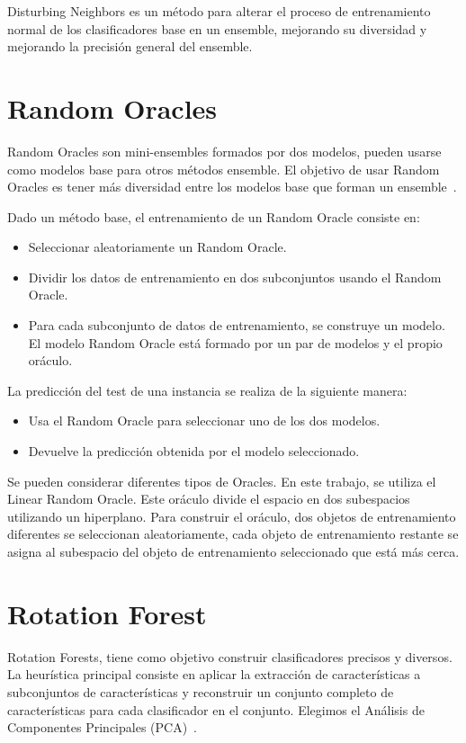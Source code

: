 Disturbing Neighbors es un método para alterar el proceso de entrenamiento normal de los clasificadores base en un ensemble, mejorando su diversidad y mejorando la precisión general del ensemble.

\section{Random Oracles}

Random Oracles son mini-ensembles formados por dos modelos, pueden usarse como modelos base para otros métodos ensemble. El objetivo de usar Random Oracles es tener más diversidad entre los modelos base que forman un ensemble~\cite{randomoracles}.

Dado un método base, el entrenamiento de un Random Oracle consiste en:
\begin{itemize}

	\item Seleccionar aleatoriamente un Random Oracle.
	\item Dividir los datos de entrenamiento en dos subconjuntos usando el Random Oracle.
	\item Para cada subconjunto de datos de entrenamiento, se construye un modelo. El modelo Random Oracle está formado por un par de modelos  y el propio oráculo.
\end{itemize}
La predicción del test de una instancia se realiza de la siguiente manera: 
\begin{itemize}
	\item Usa el Random Oracle para seleccionar uno de los dos modelos.
	\item Devuelve la predicción obtenida por el modelo seleccionado.
\end{itemize}

Se pueden considerar diferentes tipos de Oracles. En este trabajo, se utiliza el Linear Random Oracle. Este oráculo divide el espacio en dos subespacios utilizando un hiperplano. Para construir el oráculo, dos objetos de entrenamiento diferentes se seleccionan aleatoriamente, cada objeto de entrenamiento restante se asigna al subespacio del objeto de entrenamiento seleccionado que está más cerca.

\section{Rotation Forest}

Rotation Forests, tiene como objetivo construir clasificadores precisos y diversos. La heurística principal consiste en aplicar la extracción de características a subconjuntos de características y reconstruir un conjunto completo de características para cada clasificador en el conjunto. Elegimos el Análisis de Componentes Principales (PCA)~\cite{rotationforest}.

